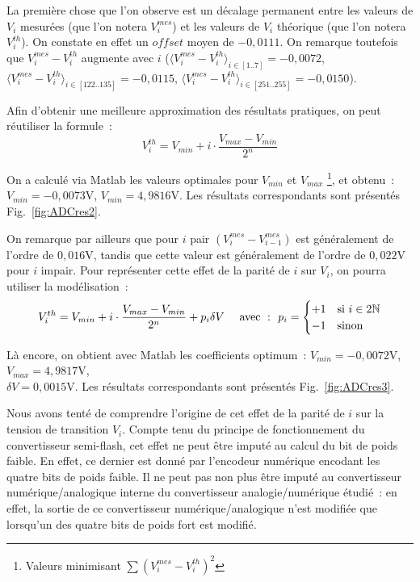 \documentclass{article}
\begin{document}

La première chose que l'on observe est un décalage permanent entre les valeurs de $V_i$ mesurées (que l'on notera $V_i^{mes}$) et les valeurs de $V_i$ théorique (que l'on notera $V_i^{th}$). On constate en effet un $offset$ moyen de $-0,0111$. On remarque toutefois que $V_i^{mes}-V_i^{th}$ augmente avec $i$ (${\langle V_i^{mes}-V_i^{th}\rangle_{i\in[1..7]}=-0,0072}$, ${\langle V_i^{mes}-V_i^{th}\rangle_{i\in[122..135]}=-0,0115}$, ${\langle V_i^{mes}-V_i^{th}\rangle_{i\in[251..255]}=-0,0150}$). 

Afin d'obtenir une meilleure approximation des résultats pratiques, on peut réutiliser la formule~:
\begin{equation*}
V_i^{th} = V_{min}+i\cdot\frac{V_{max}-V_{min}}{2^n}
\end{equation*}

On a calculé via Matlab les valeurs optimales pour $V_{min}$ et $V_{max}$ \footnote{Valeurs minimisant $\sum (V_i^{mes}-V_i^{th})^2$}, et obtenu~: ${V_{min}=-0,0073\mathrm{V}}$, ${V_{min}=4,9816\mathrm{V}}$. Les résultats correspondants sont présentés Fig.~\ref{fig:ADCres2}.

On remarque par ailleurs que pour $i$ pair $(V_i^{mes}-V_{i-1}^{mes})$ est généralement de l'ordre de $0,016\mathrm{V}$, tandis que cette valeur est généralement de l'ordre de $0,022\mathrm{V}$ pour $i$ impair. Pour représenter cette effet de la parité de $i$ sur $V_i$, on pourra utiliser la modélisation~: 
\begin{equation*}
V_i^{th} = V_{min}+i\cdot\frac{V_{max}-V_{min}}{2^n}+p_i\delta V \mathrm{~~~~avec~:~~}p_i = \begin{cases} +1 &\mathrm{si~} i\in 2\mathbb{N} \\ -1 & \mbox{sinon}\end{cases}
\end{equation*}

Là encore, on obtient avec Matlab les coefficients optimum~: ${V_{min}=-0,0072\mathrm{V}}$, ${V_{max}=4,9817\mathrm{V}}$, \\${\delta V=0,0015\mathrm{V}}$. Les résultats correspondants sont présentés Fig.~\ref{fig:ADCres3}.



Nous avons tenté de comprendre l'origine de cet effet de la parité de $i$ sur la tension de transition $V_i$. Compte tenu du principe de fonctionnement du convertisseur semi-flash, cet effet ne peut être imputé au calcul du bit de poids faible. En effet, ce dernier est donné par l'encodeur numérique encodant les quatre bits de poids faible. Il ne peut pas non plus être imputé au convertisseur numérique/analogique interne du convertisseur analogie/numérique étudié~: en effet, la sortie de ce convertisseur numérique/analogique n'est modifiée que lorsqu'un des quatre bits de poids fort est modifié. 
\end{document}
